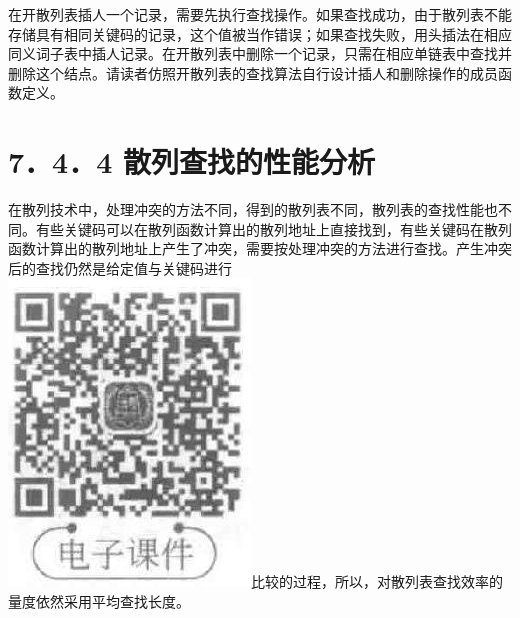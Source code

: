 \documentclass[10pt]{article}
\begin{document}
在开散列表插人一个记录，需要先执行查找操作。如果查找成功，由于散列表不能存储具有相同关键码的记录，这个值被当作错误；如果查找失败，用头插法在相应同义词子表中插人记录。在开散列表中删除一个记录，只需在相应单链表中查找并删除这个结点。请读者仿照开散列表的查找算法自行设计插人和删除操作的成员函数定义。

\section*{7．4．4 散列查找的性能分析}
在散列技术中，处理冲突的方法不同，得到的散列表不同，散列表的查找性能也不同。有些关键码可以在散列函数计算出的散列地址上直接找到，有些关键码在散列函数计算出的散列地址上产生了冲突，需要按处理冲突的方法进行查找。产生冲突后的查找仍然是给定值与关键码进行\\
\includegraphics[max width=\textwidth]{2025_06_06_704745ea57b15b2333e5g-259}比较的过程，所以，对散列表查找效率的量度依然采用平均查找长度。
\end{document}
